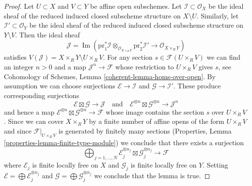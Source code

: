 \documentclass{stacks-project}
\theoremstyle{plain}
\theoremstyle{definition}
\theoremstyle{remark}
\numberwithin{equation}{subsection}
\def\Im{\mathop{\mathrm{Im}}}
\begin{document}
\begin{proof}
Let $U \subset X$ and $V \subset Y$ be affine open subschemes. Let
$\mathcal{I} \subset \mathcal{O}_X$ be the ideal sheaf of the
reduced induced closed subscheme structure on $X \setminus U$.
Similarly, let $\mathcal{I}' \subset \mathcal{O}_Y$ be the ideal sheaf of the
reduced induced closed subscheme structure on $Y \setminus V$.
Then the ideal sheaf
$$
\mathcal{J} = \Im(\text{pr}_1^*\mathcal{I} \otimes_{\mathcal{O}_{X \times_R Y}}
\text{pr}_2^*\mathcal{I}' \to \mathcal{O}_{X \times_R Y})
$$
satisfies $V(\mathcal{J}) = X \times_R Y \setminus U \times_R V$.
For any section $s \in \mathcal{F}(U \times_R V)$ we can find an integer
$n > 0$ and a map $\mathcal{J}^n \to \mathcal{F}$ whose restriction to
$U \times_R V$ gives $s$, see
Cohomology of Schemes, Lemma \ref{coherent-lemma-homs-over-open}.
By assumption we can choose surjections
$\mathcal{E} \to \mathcal{I}$ and $\mathcal{G} \to \mathcal{I}'$.
These produce corresponding surjections
$$
\mathcal{E} \boxtimes \mathcal{G} \to \mathcal{J}
\quad\text{and}\quad
\mathcal{E}^{\otimes n} \boxtimes \mathcal{G}^{\otimes n} \to \mathcal{J}^n
$$
and hence a map
$\mathcal{E}^{\otimes n} \boxtimes \mathcal{G}^{\otimes n} \to \mathcal{F}$
whose image contains the section $s$ over $U \times_R V$.
Since we can cover $X \times_R Y$ by a finite number of affine opens
of the form $U \times_R V$ and since $\mathcal{F}|_{U \times_R V}$
is generated by finitely many sections (Properties, Lemma
\ref{properties-lemma-finite-type-module})
we conclude that there exists a surjection
$$
\bigoplus\nolimits_{j = 1, \ldots, N}
\mathcal{E}_j^{\otimes n_j} \boxtimes \mathcal{G}_j^{\otimes n_j}
\to \mathcal{F}
$$
where $\mathcal{E}_j$ is finite locally free on $X$ and
$\mathcal{G}_j$ is finite locally free on $Y$.
Setting $\mathcal{E} = \bigoplus \mathcal{E}_j^{\otimes n_j}$
and $\mathcal{G} = \bigoplus \mathcal{G}_j^{\otimes n_j}$
we conclude that the lemma is true.
\end{proof}
\end{document}
